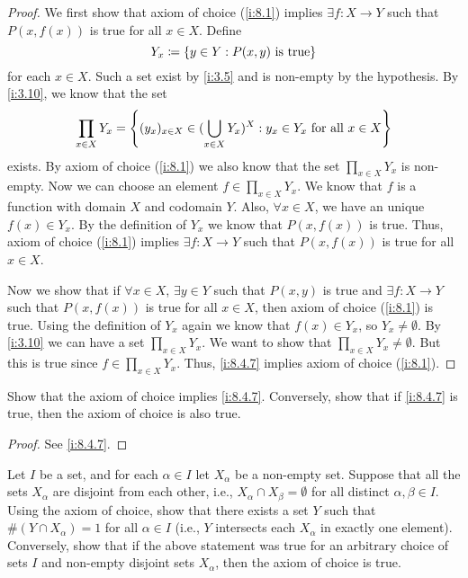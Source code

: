 \begin{proof}
  We first show that axiom of choice (\cref{i:8.1}) implies \(\exists f : X \to Y\) such that \(P(x, f(x))\) is true for all \(x \in X\).
  Define
  \[
    Y_x \coloneqq \left\lbrace y \in Y : P(x, y) \text{ is true}\right\rbrace
  \]
  for each \(x \in X\).
  Such a set exist by \cref{i:3.5} and is non-empty by the hypothesis.
  By \cref{i:3.10}, we know that the set
  \[
    \prod_{x \in X} Y_x = \left\lbrace(y_x)_{x \in X} \in (\bigcup_{x \in X} Y_x)^X : y_x \in Y_x \text{ for all } x \in X\right\rbrace
  \]
  exists.
  By axiom of choice (\cref{i:8.1}) we also know that the set \(\prod_{x \in X} Y_x\) is non-empty.
  Now we can choose an element \(f \in \prod_{x \in X} Y_x\).
  We know that \(f\) is a function with domain \(X\) and codomain \(Y\).
  Also, \(\forall x \in X\), we have an unique \(f(x) \in Y_x\).
  By the definition of \(Y_x\) we know that \(P(x, f(x))\) is true.
  Thus, axiom of choice (\cref{i:8.1}) implies \(\exists f : X \to Y\) such that \(P(x, f(x))\) is true for all \(x \in X\).

  Now we show that if \(\forall x \in X\), \(\exists y \in Y\) such that \(P(x, y)\) is true and \(\exists f : X \to Y\) such that \(P(x, f(x))\) is true for all \(x \in X\), then axiom of choice (\cref{i:8.1}) is true.
  Using the definition of \(Y_x\) again we know that \(f(x) \in Y_x\), so \(Y_x \neq \emptyset\).
  By \cref{i:3.10} we can have a set \(\prod_{x \in X} Y_x\).
  We want to show that \(\prod_{x \in X} Y_x \neq \emptyset\).
  But this is true since \(f \in \prod_{x \in X} Y_x\).
  Thus, \cref{i:8.4.7} implies axiom of choice (\cref{i:8.1}).
\end{proof}

\exercisesection

\begin{ex}\label{i:ex:8.4.1}
  Show that the axiom of choice implies \cref{i:8.4.7}.
  Conversely, show that if \cref{i:8.4.7} is true, then the axiom of choice is also true.
\end{ex}

\begin{proof}
  See \cref{i:8.4.7}.
\end{proof}

\begin{ex}\label{i:ex:8.4.2}
  Let \(I\) be a set, and for each \(\alpha \in I\) let \(X_{\alpha}\) be a non-empty set.
  Suppose that all the sets \(X_{\alpha}\) are disjoint from each other, i.e., \(X_{\alpha} \cap X_{\beta} = \emptyset\) for all distinct \(\alpha, \beta \in I\).
  Using the axiom of choice, show that there exists a set \(Y\) such that \(\#(Y \cap X_{\alpha}) = 1\) for all \(\alpha \in I\) (i.e., \(Y\) intersects each \(X_{\alpha}\) in exactly one element).
  Conversely, show that if the above statement was true for an arbitrary choice of sets \(I\) and non-empty disjoint sets \(X_{\alpha}\), then the axiom of choice is true.
\end{ex}

